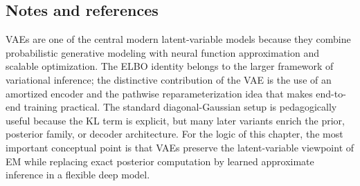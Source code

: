 \subsection*{Notes and references}

VAEs are one of the central modern latent-variable models because they combine probabilistic generative modeling with neural function approximation and scalable optimization.
The ELBO identity belongs to the larger framework of variational inference; the distinctive contribution of the VAE is the use of an amortized encoder and the pathwise reparameterization idea that makes end-to-end training practical.
The standard diagonal-Gaussian setup is pedagogically useful because the KL term is explicit, but many later variants enrich the prior, posterior family, or decoder architecture.
For the logic of this chapter, the most important conceptual point is that VAEs preserve the latent-variable viewpoint of EM while replacing exact posterior computation by learned approximate inference in a flexible deep model.
